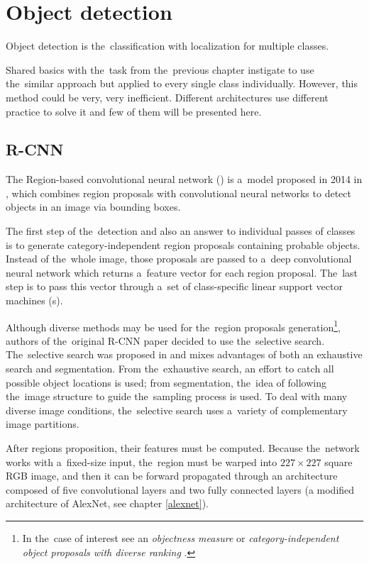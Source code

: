 \section{Object detection}
\label{object-detection}

Object detection is the~classification with localization for multiple classes.

Shared basics with the~task from the~previous chapter instigate to use
the~similar approach but applied to every single class individually. However, this 
method could be very, very inefficient. Different architectures use different 
practice to solve it and few of them will be presented here.

\subsection{R-CNN}
\label{r-cnn}

The Region-based convolutional neural network () is a~model proposed 
in 2014 in \cite{rcnn}, which combines region proposals with convolutional 
neural networks to detect objects in an image via bounding boxes. 

The first step of the~detection and also an answer to individual passes of 
classes is to generate category-independent region proposals containing probable 
objects. Instead of the~whole image, those proposals are passed to a~deep 
convolutional neural network which returns a~feature vector for each region 
proposal. The~last step is to pass this vector through a~set of class-specific 
linear support vector machines (s).

Although diverse methods may be used for the~region proposals 
generation\footnote{In the~case of interest see an \textit{objectness measure} 
\cite{objectness} or \textit{category-independent object proposals with diverse 
ranking} \cite{cat-independent-proposals}.}, authors of the~original R-CNN paper 
decided to use the~selective search. The~selective search was proposed in 
\cite{selective-search} and mixes advantages of both an exhaustive search and 
segmentation. From the~exhaustive search, an effort to catch all possible object 
locations is used; from segmentation, the~idea of following the~image structure 
to guide the~sampling process is used. To deal with many diverse image 
conditions, the~selective search uses a~variety of complementary image 
partitions.

After regions proposition, their features must be computed. Because the~network 
works with a~fixed-size input, the~region must be warped into $227 \times 227$ 
square RGB image, and then it can be forward propagated through an architecture 
composed of five convolutional layers and two fully connected layers (a modified 
architecture of AlexNet, see chapter \ref{alexnet}).

